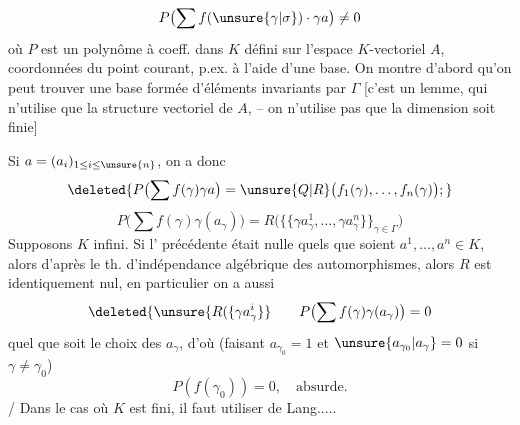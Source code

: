 \[
P\bigl(\sum f(\unsure{\gamma|\sigma})\cdot\gamma a\bigr)\ne0
\]
où $P$ est un polynôme à coeff. dans $K$  défini sur l'espace $K$-vectoriel $A$,  coordonnées  du point courant, p.ex. à l'aide d'une base. On montre d'abord qu'on peut trouver une base formée d'éléments invariants par $\Gamma$ [c'est un lemme, qui n'utilise que la structure  vectoriel de $A$, -- on n'utilise pas que la dimension soit finie]

Si $a=(a_i)_{1\leq i\leq\unsure{n}}$, on a donc
\[
\deleted{P\bigl(\sum f(\gamma)\gamma a\bigr)=\unsure{Q|R}\bigl(f_1(\gamma),\ldots,f_n(\gamma)\bigr);}
\]
\[
P\bigl(\sum f(\gamma)\gamma(a_\gamma)\bigr)=R\bigl(\{\{\gamma a_\gamma^1,\ldots,\gamma a_\gamma^n\}\}_{\gamma\in\Gamma}\bigr)
\]
Supposons $K$ infini. Si l' précédente était nulle  quels que soient $a^1,\ldots,a^n\in K$, alors d'après le th. d'indépendance algébrique des automorphismes, alors $R$ est identiquement nul, en particulier on a \deleted{\unsure{$\sum$}} aussi
\[
\deleted{\unsure{R(\{\gamma a_\gamma^i}}\qquad P\bigl(\sum f(\gamma)\gamma(a_\gamma)\bigr)=0
\]
quel que soit le choix des $a_\gamma$, d'où (faisant $a_{\gamma_0}=1$ et $\unsure{a_{\gamma_0}|a_\gamma}=0$ si $\gamma\ne\gamma_0$)
\[
P(f(\gamma_0))=0,\quad\text{absurde.}
\]
/ Dans le cas où $K$ est fini, il faut utiliser  de Lang.....
